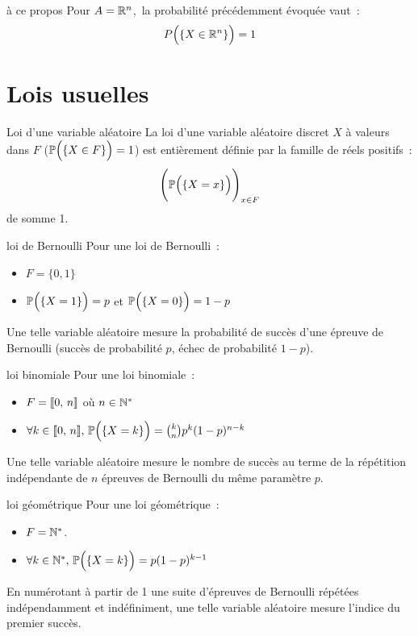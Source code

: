 \begin{remarque}{}{à ce propos}
    Pour $A = \mathbb{R}^n$,\, la probabilité précédemment évoquée vaut~:
    $$P\Big(\{X \in \mathbb{R}^n\}\Big) = 1$$
\end{remarque}
\section{Lois usuelles}

\begin{definition}{}{Loi d'une variable aléatoire}
    La loi d'une variable aléatoire discret $X$ à valeurs dans $F$ (\ie $\mathbb{P}\Big(\{X \in F\}\Big)=1$) est entièrement définie par la famille de réels positifs~:
    $$\Bigg(\mathbb{P}\Big(\{X = x\}\Big)\Bigg)_{x \in F}$$
    de somme 1.
\end{definition}

\begin{exemple}{}{loi de Bernoulli}
    Pour une loi de Bernoulli~:
    \begin{itemize}
        \item $F = \{0, 1\}$
        \item $\mathbb{P}\Big(\{X = 1\}\Big) = p$ et $\mathbb{P}\Big(\{X = 0\}\Big) = 1-p$
    \end{itemize}
    Une telle variable aléatoire mesure la probabilité de succès d'une épreuve de Bernoulli (succès de probabilité $p$, échec de probabilité $1-p$).
\end{exemple}

\begin{exemple}{}{loi binomiale}
    Pour une loi binomiale~:
    \begin{itemize}
        \item $F = \llbracket 0 ,\, n \rrbracket$ où $n \in \mathbb{N}^*$
        \item $\forall k \in \llbracket 0 ,\, n \rrbracket,\, \mathbb{P}\Big(\{X = k\}\Big) = \binom{k}{n}p^k(1-p)^{n-k}$
    \end{itemize}
    Une telle variable aléatoire mesure le nombre de succès au terme de la répétition indépendante de $n$ épreuves de Bernoulli du même paramètre $p$.
\end{exemple}

\begin{exemple}{}{loi géométrique}
    Pour une loi géométrique~:
    \begin{itemize}
        \item $F = \mathbb{N}^*$.
        \item $\forall k \in \mathbb{N}^*,\, \mathbb{P}\Big(\{X = k\}\Big) = p (1-p)^{k-1}$
    \end{itemize}
    En numérotant à partir de 1 une suite d'épreuves de Bernoulli répétées indépendamment et indéfiniment, une telle variable aléatoire mesure l'indice du premier succès. 
\end{exemple}

